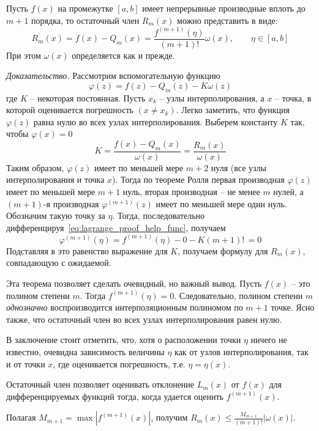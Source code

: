\begin{theorem}
    Пусть $f(x)$ на промежутке $[a, b]$ имеет непрерывные производные вплоть до $m+1$ порядка, то остаточный член
    $R_m(x)$ можно представить в виде:
    \begin{equation}
        R_m(x) = f(x) - Q_m(x) = \frac{\displaystyle f^{(m+1)}(\eta)}{(m+1)!}\omega(x), \qquad \eta \in [a, b]
    \end{equation}
    При этом $\omega(x)$ определяется как и прежде.

    \emph{Доказательство.} Рассмотрим вспомогательную функцию
    \begin{equation}
        \varphi(z) = f(z) - Q_m(z) - K\omega(z)\label{eq:lagrange_proof_help_func}
    \end{equation}
    где $K$ -- некоторая постоянная. Пусть $x_k$ -- узлы интерполирования, а $x$ -- точка, в которой оценивается
    погрешность $(x \neq x_k)$. Легко заметить, что функция $\varphi(z)$ равна нулю во всех узлах интерполирования. Выберем
    константу $K$ так, чтобы $\varphi(x) = 0$
    \begin{equation*}
        K = \frac{f(x) - Q_m(x)}{\omega(x)} = \frac{R_m(x)}{\omega(x)}
    \end{equation*}
    Таким образом, $\varphi(z)$ имеет по меньшей мере $m + 2$ нуля (все узлы интерполирования и точка $x$). Тогда по теореме
    Ролля первая производная $\varphi(z)$ имеет по меньшей мере $m+1$ нуль, вторая производная -- не менее $m$ нулей, а
    $(m+1)$-я производная $\displaystyle \varphi^{(m+1)}(z)$ имеет по меньшей мере один нуль. Обозначим такую точку за $\eta$.
    Тогда, последовательно дифференцируя~\eqref{eq:lagrange_proof_help_func}, получаем
    \begin{equation*}
        \varphi^{(m+1)}(\eta) = f^{(m+1)}(\eta) - 0 - K(m+1)!\, = 0
    \end{equation*}
    Подставляя в это равенство выражение для $K$, получаем формулу для $R_m(x)$, совпадающую с ожидаемой.
\end{theorem}

Эта теорема позволяет сделать очевидный, но важный вывод. Пусть $f(x)$ -- это полином степени $m$. Тогда
$f^{(m+1)}(\eta) = 0$. Следовательно, полином степени $m$ \emph{однозначно} воспроизводится интерполяционным полиномом по
$m+1$ точке. Ясно также, что остаточный член во всех узлах интерполирования равен нулю.

В заключение стоит отметить, что, хотя о расположении точки $\eta$ ничего не известно, очевидна зависимость величины $\eta$
как от узлов интерполирования, так и от точки $x$, где оценивается погрешность, т.е. $\eta = \eta(x)$.

Остаточный член позволяет оценивать отклонение $L_m(x)$ от $f(x)$ для дифференцируемых функций тогда, когда удается
оценить $\displaystyle f^{(m+1)}(x)$.

Полагая $\displaystyle M_{m+1} = \max | f^{(m+1)}(x) |$, получим $\displaystyle R_m(x) \leq \frac{M_{m+1}}{(m+1)!} |\omega(x)|$.
